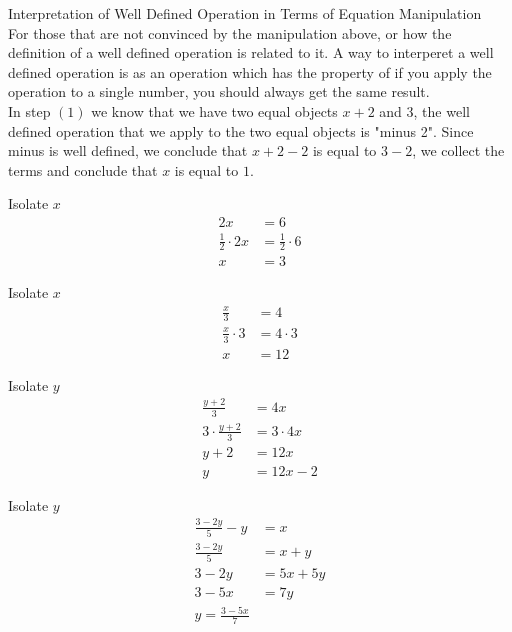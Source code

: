 \documentclass{book}
\begin{document}
  {\remark Interpretation of Well Defined Operation in Terms of Equation Manipulation \\
    For those that are not convinced by the manipulation above, or how the definition of a well defined operation is related to it. A way to interperet a well defined operation is as an operation which has the property of if you apply the operation to a single number, you should always get the same result.\\

     In step $(1)$ we know that we have two equal objects $x + 2$ and $3$, the well defined operation that we apply to the two equal objects is "minus 2". Since minus is well defined, we conclude that $x + 2 - 2$ is equal to $3 - 2$, we collect the terms and conclude that $x$ is equal to $1$.\\
  }

  {\example Isolate $x$ \\
    \begin{align*}
      2x & = 6\\
      \frac{1}{2} \cdot 2x & = \frac{1}{2} \cdot 6\\
      x & = 3
    \end{align*}
  }

  {\example Isolate $x$ \\
    \begin{align*}
      \frac{x}{3} & = 4\\
      \frac{x}{3} \cdot 3 & = 4 \cdot 3\\
      x & = 12
    \end{align*}
  }

  {\example Isolate $y$ \\
    \begin{align*}
      \frac{y + 2}{3} & = 4x\\
      3 \cdot \frac{y + 2}{3} & = 3 \cdot 4x\\
      y + 2 & = 12x\\
      y & = 12x - 2
    \end{align*}
  }

  {\example Isolate $y$ \\
    \begin{align*}
      \frac{3 - 2y}{5} - y & = x\\
      \frac{3 - 2y}{5} & = x + y\\
      3 - 2y & = 5x + 5y\\
      3 - 5x & = 7y\\
      y = \frac{3 - 5x}{7}
    \end{align*}
  }
\end{document}
